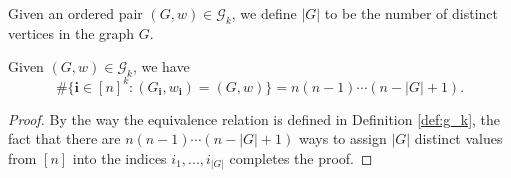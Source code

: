 \begin{definition}
  \label{def:abs.G}
  Given an ordered pair $(G,w) \in \mathcal{G}_k$, we define $|G|$ to be the number of distinct vertices in the graph $G$.
\end{definition}
\begin{lemma}
  \label{lem:lem_4.3}
  Given $(G,w) \in \mathcal{G}_k$, we have
  \[
  \# \{ \mathbf{i} \in [n]^k : (G_\mathbf{i},w_\mathbf{i}) = (G,w) \} = n (n-1) \cdots (n - |G| + 1).
  \]
\end{lemma}
\begin{proof}
  By the way the equivalence relation is defined in Definition \ref{def:g_k}, 
  the fact that there are $n (n - 1) \cdots (n -|G| + 1)$ ways to assign $|G|$ distinct values from $[n]$ into the indices $i_1,...,i_{|G|}$ completes the proof.
\end{proof}
